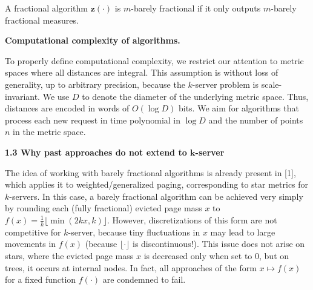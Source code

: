 \documentclass[10pt,a4paper]{article}
\begin{document}
A fractional algorithm ${\mathbf{z}}(\cdot)$ is $m$-barely fractional if it only outputs $m$-barely fractional measures.\par





\par\medskip\noindent\textbf{Computational complexity of algorithms.}\par




To properly define computational complexity, we restrict our attention to metric spaces where all distances are integral. This assumption is without loss of generality, up to arbitrary precision, because the $k$-server problem is scale-invariant. We use $D$ to denote the diameter of the underlying metric space. Thus, distances are encoded in words of $O(\log D)$ bits. We aim for algorithms that process each new request in time polynomial in $\log D$ and the number of points $n$ in the metric space.\par






\par\medskip\noindent\textbf{
1.3 Why past approaches do not extend to $\boldsymbol{k}$-server}\par




The idea of working with barely fractional algorithms is already present in [1], which applies it to weighted/generalized paging, corresponding to star metrics for $k$-servers. In this case, a barely fractional algorithm can be achieved very simply by rounding each (fully fractional) evicted page mass $x$ to $f(x)=\frac{1}{k}\lfloor\min(2kx,k)\rfloor$. However, discretizations of this form are not competitive for $k$-server, because tiny fluctuations in $x$ may lead to large movements in $f(x)$ (because ${\lfloor\cdot\rfloor}$ is discontinuous!). This issue does not arise on stars, where the evicted page mass $x$ is decreased only when set to $0$, but on trees, it occurs at internal nodes. In fact, all approaches of the form $x\mapsto f(x)$ for a fixed function $f(\cdot)$ are condemned to fail.\par
\end{document}
